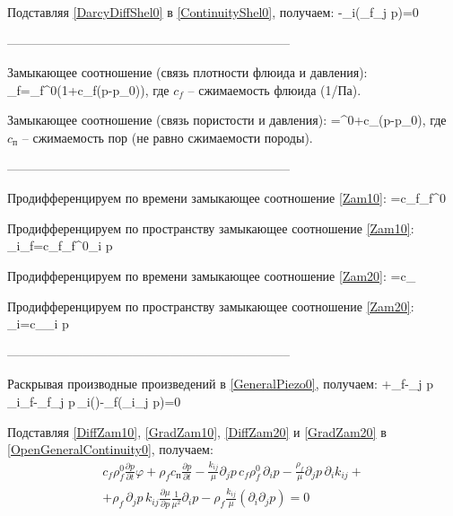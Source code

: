 Подставляя \eqref{DarcyDiffShel0} в \eqref{ContinuityShel0}, получаем:
\beq\label{GeneralPiezo0}
-\partial_i\left(\rho_f\partial_j p\right)=0
\eeq

--------------------------------------------------------------------

Замыкающее соотношение (связь плотности флюида и давления):
\beq\label{Zam10}
\rho_f=\rho_f^0\left(1+c_f\left(p-p_0\right)\right),
\eeq
где $c_f$ -- сжимаемость флюида (1/Па).


Замыкающее соотношение (связь пористости и давления):
\beq\label{Zam20}
\varphi=\varphi^0+c_{}\left(p-p_0\right),
\eeq
где $c_{\text{п}}$ -- сжимаемость пор (не равно сжимаемости породы).

--------------------------------------------------------------------

Продифференцируем по времени замыкающее соотношение \eqref{Zam10}:
\beq\label{DiffZam10}
=c_f\rho_f^0
\eeq

Продифференцируем по пространству замыкающее соотношение \eqref{Zam10}:
\beq\label{GradZam10}
\partial_i\rho_f=c_f\rho_f^0\partial_i p
\eeq

Продифференцируем по времени замыкающее соотношение \eqref{Zam20}:
\beq\label{DiffZam20}
=c_
\eeq

Продифференцируем по пространству замыкающее соотношение \eqref{Zam20}:
\beq\label{GradZam20}
\partial_i\varphi=c_\partial_i p
\eeq

--------------------------------------------------------------------

Раскрывая производные произведений в \eqref{GeneralPiezo0}, получаем:
\beq\label{OpenGeneralContinuity0}
\varphi+\rho_f-\partial_j p\,\partial_i\rho_f-\rho_f\partial_j p\,\partial_i\!\left(\right)-\rho_f\left(\partial_i\partial_j p\right)=0
\eeq

Подставляя \eqref{DiffZam10}, \eqref{GradZam10}, \eqref{DiffZam20} и \eqref{GradZam20} в \eqref{OpenGeneralContinuity0}, получаем:
\begin{multline}\label{Expanded0}
c_f\rho_f^0\frac{\partial p}{\partial t}\varphi+\rho_f c_\text{п}\frac{\partial p}{\partial t}-\frac{k_{ij}}{\mu}\partial_j p\,c_f\rho_f^0\,\partial_i p-\frac{\rho_f}{\mu}\partial_j p\,\partial_i k_{ij}+\\+\rho_f\,\partial_j p\,k_{ij}\frac{\partial\mu}{\partial p}\frac{1}{\mu^2}\partial_i p-\rho_f\frac{k_{ij}}{\mu}\left(\partial_i\partial_j p\right)=0
\end{multline}

